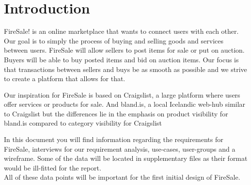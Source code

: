 \section{Introduction}
FireSale! is an online marketplace that wants to connect users with each other. Our goal is to simply the process of buying and selling goods and services between users. FireSale will allow sellers to post items for sale or put on auction. Buyers will be able to buy posted items and bid on auction items. Our focus is that transactions between sellers and buys be as smooth as possible and we strive to create a platform that allows for that.

Our inspiration for FireSale is based on Craigslist, a large platform where users offer services or products for sale. And bland.is, a local Icelandic web-hub similar to Craigslist but the differences lie in the emphasis on product visibility for bland.is compared to category visibility for Craigslist

In this document you will find information regarding the requirements for FireSale, interviews for our requirement analysis, use-cases, user-groups and a wireframe. Some of the data will be located in supplementary files as their format would be ill-fitted for the report.\\
All of these data points will be important for the first initial design of FireSale.

